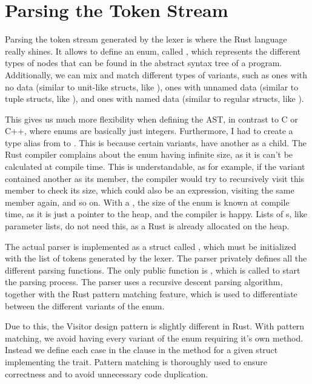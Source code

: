 
\section{Parsing the Token Stream}

Parsing the token stream generated by the lexer is where the Rust language
really shines. It allows to define an enum, called , which
represents the different types of nodes that can be found in the abstract syntax
tree of a  program. Additionally, we can mix and match different
types of variants, such as ones with no data (similar to unit-like structs, like
), ones with unnamed data (similar to tuple structs, like
), and ones with named data (similar to regular
structs, like ).

This gives us much more flexibility when defining the AST, in contrast to C or
C++, where enums are basically just integers. Furthermore, I had to create a
type alias from  to . This is because
certain  variants, have another  as a child. The
Rust compiler complains about the enum having infinite size, as it is can't be
calculated at compile time. This is understandable, as for example, if the
 variant contained another  as its
member, the compiler would try to recursively visit this member to check its
size, which could also be an expression, visiting the same member again, and so
on. With a , the size of the enum is known at compile time, as it is
just a pointer to the heap, and the compiler is happy. Lists of s,
like parameter lists, do not need this, as a Rust  is already
allocated on the heap.

The actual parser is implemented as a struct called , which must be
initialized with the list of tokens generated by the lexer. The parser privately
defines all the different parsing functions. The only public function is
, which is called to start the parsing process. The parser uses a
recursive descent parsing algorithm, together with the Rust pattern matching
feature, which is used to differentiate between the different variants of the
 enum.

Due to this, the Visitor design pattern is slightly different in Rust. With
pattern matching, we avoid having every variant of the  enum
requiring it's own  method. Instead we define each case in the
 clause in the  method for a given struct implementing
the  trait. Pattern matching is thoroughly used to ensure
correctness and to avoid unnecessary code duplication.

